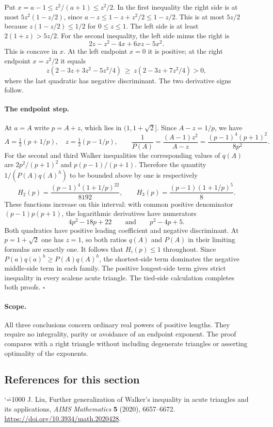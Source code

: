 \documentclass[11pt,a4paper]{article}
\makeatletter
\numberwithin{equation}{section}
\theoremstyle{definition}
\theoremstyle{remark}
\renewenvironment{thebibliography}[1]
 {\subsection*{References for this section}\small
  \list{\@biblabel{\@arabic\c@enumiv}}
       {\settowidth\labelwidth{\@biblabel{#1}}\leftmargin\labelwidth
        \advance\leftmargin\labelsep\@openbib@code
        \usecounter{enumiv}\let\p@enumiv\@empty
        \renewcommand\theenumiv{\@arabic\c@enumiv}}
  \sloppy\clubpenalty4000\widowpenalty4000\sfcode`\.=1000\relax}
 {\def\@noitemerr{\@latex@warning{Empty bibliography}}\endlist}
\makeatother
\begin{document}
Put $x=a-1\le z^2/(a+1)\le z^2/2$. In the first inequality the right side is at most $5z^2(1-z/2)$, since $a-z\le1-z+z^2/2\le1-z/2$. This is at most $5z/2$ because $z(1-z/2)\le1/2$ for $0\le z\le1$. The left side is at least $2(1+z)>5z/2$. For the second inequality, the left side minus the right is
\[
              2z-z^2-4x+6xz-5x^2.
\]
This is concave in $x$. At the left endpoint $x=0$ it is positive; at the right endpoint $x=z^2/2$ it equals
\[
 z(2-3z+3z^2-5z^3/4)\ \ge\ z(2-3z+7z^2/4)>0,
\]
where the last quadratic has negative discriminant. The two derivative signs follow.


\paragraph{The endpoint step.}
At $a=A$ write $p=A+z$, which lies in $(1,1+\sqrt2]$. Since $A-z=1/p$, we have
\[
 A=\tfrac12(p+1/p),\quad z=\tfrac12(p-1/p),\qquad
 \frac1{P(A)}=\frac{(A-1)z^2}{A-z}
 =\frac{(p-1)^4(p+1)^2}{8p^2}.
\]
For the second and third Walker inequalities the corresponding values of $q(A)$ are $2p^2/(p+1)^2$ and $p(p-1)/(p+1)$. Therefore the quantity $1/(P(A)q(A)^h)$ to be bounded above by one is respectively
\[
    H_2(p)=\frac{(p-1)^4(1+1/p)^{22}}{8192},
    \qquad
    H_3(p)=\frac{(p-1)(1+1/p)^5}{8}.
\]
These functions increase on this interval: with common positive denominator $(p-1)p(p+1)$, the logarithmic derivatives have numerators
\[
         4p^2-18p+22 \qquad\text{and}\qquad p^2-4p+5.
\]
Both quadratics have positive leading coefficient and negative discriminant. At $p=1+\sqrt2$ one has $z=1$, so both ratios $q(A)$ and $P(A)$ in their limiting formulas are exactly one. It follows that $H_i(p)\le1$ throughout. Since $P(a)q(a)^h\ge P(A)q(A)^h$, the shortest-side term dominates the negative middle-side term in each family. The positive longest-side term gives strict inequality in every scalene acute triangle. The tied-side calculation completes both proofs. \hfill$\square$

\paragraph{Scope.}
All three conclusions concern ordinary real powers of positive lengths. They require no integrality, parity or avoidance of an endpoint exponent. The proof compares with a right triangle without including degenerate triangles or asserting optimality of the exponents.

\begin{thebibliography}{1}
 J. Liu, Further generalization of Walker's inequality in acute triangles and its applications, \emph{AIMS Mathematics} \textbf{5} (2020), 6657--6672. \url{https://doi.org/10.3934/math.2020428}.
\end{thebibliography}
\end{document}
